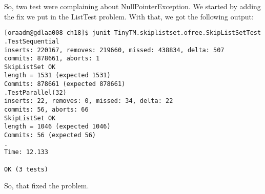 \hfill
\par
So, two test were complaining about NullPointerException. We started by adding
the fix we put in the ListTest problem. With that, we got the following output:
\par
\hfill
\begin{verbatim}
[oraadm@gdlaa008 ch18]$ junit TinyTM.skiplistset.ofree.SkipListSetTest
.TestSequential
inserts: 220167, removes: 219660, missed: 438834, delta: 507
commits: 878661, aborts: 1
SkipListSet OK
length = 1531 (expected 1531)
Commits: 878661 (expected 878661)
.TestParallel(32)
inserts: 22, removes: 0, missed: 34, delta: 22
commits: 56, aborts: 66
SkipListSet OK
length = 1046 (expected 1046)
Commits: 56 (expected 56)
.
Time: 12.133

OK (3 tests)
\end{verbatim}
\hfill
\par
So, that fixed the problem.
\par
